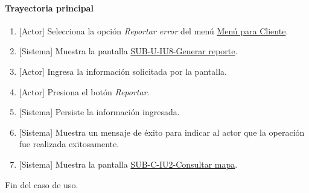 \paragraph{Trayectoria principal}
	\begin{enumerate}
		\item {[Actor]} Selecciona la opción \textit{Reportar error} del menú \hyperref[fig:menu-cliente]{Menú para Cliente}.
		\item {[Sistema]} Muestra la pantalla \hyperref[fig:sub-u-iu8]{SUB-U-IU8-Generar reporte}.
		\item {[Actor]} Ingresa la información solicitada por la pantalla.
		\item {[Actor]} Presiona el botón \textit{Reportar}.
		\item {[Sistema]} Persiste la información ingresada.
		\item {[Sistema]} Muestra un mensaje de éxito para indicar al actor que la operación fue realizada exitosamente.
		\item \label{SUB-U-CU1:Pantalla} {[Sistema]} Muestra la pantalla \hyperref[fig:sub-c-iu2]{SUB-C-IU2-Consultar mapa}.
	\end{enumerate}
	Fin del caso de uso.

